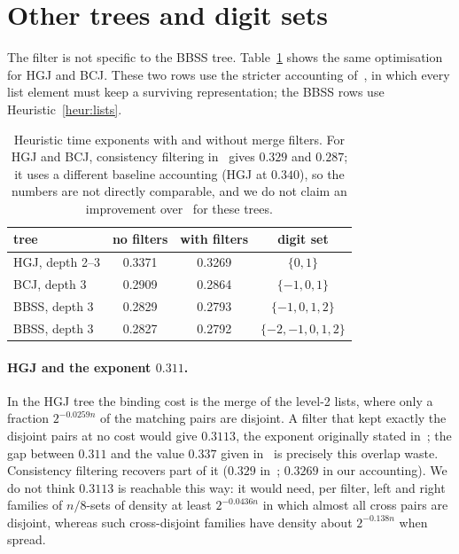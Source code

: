 \documentclass[11pt]{article}
\theoremstyle{definition}
\theoremstyle{remark}
\newcommand{\status}[1]{}   %
\begin{document}
\section{Other trees and digit sets}\label{sec:other}
The filter is not specific to the BBSS tree. Table~\ref{tab:ladder} shows the same optimisation for HGJ and BCJ.
These two rows use the stricter accounting of~\cite{HGJ10,BCJ11}, in which every list element must keep a surviving
representation; the BBSS rows use Heuristic~\ref{heur:lists}.
\status{numerical; local search}

\begin{table}[ht]
\centering
\begin{tabular}{lccc}
\toprule
tree & no filters & with filters & digit set \\
\midrule
HGJ, depth 2--3 & 0.3371 & 0.3269 & $\{0,1\}$ \\
BCJ, depth 3 & 0.2909 & 0.2864 & $\{-1,0,1\}$ \\
BBSS, depth 3 & 0.2829 & 0.2793 & $\{-1,0,1,2\}$ \\
BBSS, depth 3 & 0.2827 & 0.2792 & $\{-2,-1,0,1,2\}$ \\
\bottomrule
\end{tabular}
\caption{Heuristic time exponents with and without merge filters. For HGJ and BCJ, consistency filtering
in~\cite{Oze16} gives $0.329$ and $0.287$; it uses a different baseline accounting (HGJ at $0.340$), so the numbers
are not directly comparable, and we do not claim an improvement over~\cite{Oze16} for these trees.}
\label{tab:ladder}
\end{table}

\paragraph{HGJ and the exponent $0.311$.} In the HGJ tree the binding cost is the merge of the level-2 lists,
where only a fraction $2^{-0.0259n}$ of the matching pairs are disjoint. A filter that kept exactly the disjoint
pairs at no cost would give $0.3113$, the exponent originally stated in~\cite{HGJ10}; the gap between $0.311$ and
the value $0.337$ given in~\cite{BCJ11} is precisely this overlap waste. Consistency filtering recovers part of it ($0.329$ in~\cite{Oze16}; $0.3269$ in our accounting). We do not think
$0.3113$ is reachable this way: it would need, per filter, left and right families of $n/8$-sets of density at least
$2^{-0.0436n}$ in which almost all cross pairs are disjoint, whereas such cross-disjoint families have density about
$2^{-0.138n}$ when spread.
\status{heuristic argument, not a proof}
\end{document}
